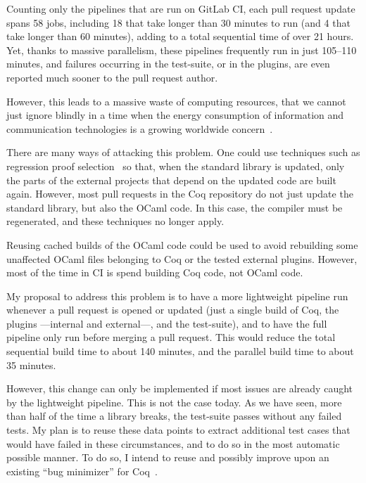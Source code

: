 \label{sec:duration}

Counting only the pipelines that are run on GitLab CI, each pull request update spans 58 jobs, including 18 that take longer than 30 minutes to run (and 4 that take longer than 60 minutes), adding to a total sequential time of over 21 hours.
Yet, thanks to massive parallelism, these pipelines frequently run in just 105--110 minutes, and failures occurring in the test-suite, or in the plugins, are even reported much sooner to the pull request author.

However, this leads to a massive waste of computing resources, that we cannot just ignore blindly in a time when the energy consumption of information and communication technologies is a growing worldwide concern~\cite{Aebischer2015TheED}.

There are many ways of attacking this problem.
One could use techniques such as regression proof selection~\cite{celik2017regression,Palmskog2018regression} so that, when the standard library is updated, only the parts of the external projects that depend on the updated code are built again.
However, most pull requests in the Coq repository do not just update the standard library, but also the OCaml code.
In this case, the compiler must be regenerated, and these techniques no longer apply.

Reusing cached builds of the OCaml code could be used to avoid rebuilding some unaffected OCaml files belonging to Coq or the tested external plugins.
However, most of the time in CI is spend building Coq code, not OCaml code.

My proposal to address this problem is to have a more lightweight pipeline run whenever a pull request is opened or updated (just a single build of Coq, the plugins ---internal and external---, and the test-suite), and to have the full pipeline only run before merging a pull request.
This would reduce the total sequential build time to about 140 minutes, and the parallel build time to about 35 minutes.

However, this change can only be implemented if most issues are already caught by the lightweight pipeline.
This is not the case today.
As we have seen, more than half of the time a library breaks, the test-suite passes without any failed tests.
My plan is to reuse these data points to extract additional test cases that would have failed in these circumstances, and to do so in the most automatic possible manner.
To do so, I intend to reuse and possibly improve upon an existing ``bug minimizer'' for Coq~\cite{gross_bug_min}.

